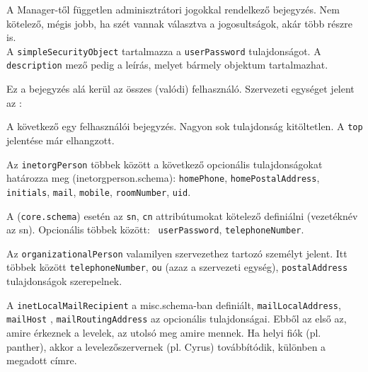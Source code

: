 
A Manager-től független adminisztrátori jogokkal rendelkező bejegyzés. Nem kötelező, mégis jobb, ha szét vannak
választva a jogosultságok, akár több részre is.\\ A \texttt{simpleSecurityObject} tartalmazza a \texttt{userPassword}
tulajdonságot. A \texttt{description} mező pedig a leírás, melyet bármely objektum tartalmazhat.



Ez a bejegyzés alá kerül az összes (valódi) felhasználó. Szervezeti egységet jelent az :


A következő egy felhasználói bejegyzés. Nagyon sok tulajdonság kitöltetlen. A \texttt{top} jelentése már elhangzott.

Az \texttt{inetorgPerson} többek között a következő opcionális tulajdonságokat határozza meg (inetorgperson.schema):
\texttt{homePhone}, \texttt{homePostalAddress}, \texttt{initials}, \texttt{mail},  \texttt{mobile},
\texttt{roomNumber}, \texttt{uid}.

A  (\texttt{core.schema}) esetén az \texttt{sn}, \texttt{cn} attribútumokat kötelező definiálni
(vezetéknév az sn). Opcionális többek között: \texttt{ userPassword}, \texttt{telephoneNumber}.


Az \texttt{organizationalPerson} valamilyen szervezethez tartozó személyt jelent. Itt többek között
\texttt{telephoneNumber}, \texttt{ou} (azaz a szervezeti egység), \texttt{postalAddress} tulajdonságok szerepelnek.

A \texttt{inetLocalMailRecipient} a misc.schema-ban definiált, \texttt{mailLocalAddress}, \texttt{mailHost} ,
\texttt{mailRoutingAddress} az opcionális tulajdonságai. Ebből az első az, amire érkeznek a levelek, az utolsó meg
amire mennek. Ha helyi fiók (pl. panther), akkor a levelezőszervernek (pl. Cyrus) továbbítódik, különben a megadott
címre.

